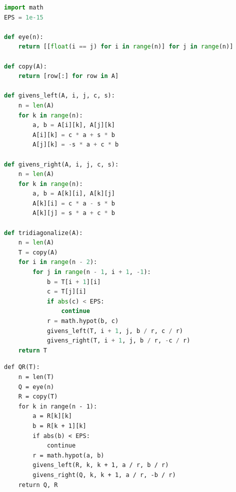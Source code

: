 \documentclass{article}
\begin{document}
\clearpage
\problem{}
\begin{lstlisting}[language=Python]
import math
EPS = 1e-15

def eye(n):
    return [[float(i == j) for i in range(n)] for j in range(n)]

def copy(A):
    return [row[:] for row in A]

def givens_left(A, i, j, c, s):
    n = len(A)
    for k in range(n):
        a, b = A[i][k], A[j][k]
        A[i][k] = c * a + s * b
        A[j][k] = -s * a + c * b

def givens_right(A, i, j, c, s):
    n = len(A)
    for k in range(n):
        a, b = A[k][i], A[k][j]
        A[k][i] = c * a - s * b
        A[k][j] = s * a + c * b

def tridiagonalize(A):
    n = len(A)
    T = copy(A)
    for i in range(n - 2):
        for j in range(n - 1, i + 1, -1):
            b = T[i + 1][i]
            c = T[j][i]
            if abs(c) < EPS:
                continue
            r = math.hypot(b, c)
            givens_left(T, i + 1, j, b / r, c / r)
            givens_right(T, i + 1, j, b / r, -c / r)
    return T
\end{lstlisting}
\begin{lstlisting}
def QR(T):
    n = len(T)
    Q = eye(n)
    R = copy(T)
    for k in range(n - 1):
        a = R[k][k]
        b = R[k + 1][k]
        if abs(b) < EPS:
            continue
        r = math.hypot(a, b)
        givens_left(R, k, k + 1, a / r, b / r)
        givens_right(Q, k, k + 1, a / r, -b / r)
    return Q, R
\end{lstlisting}
\end{document}
